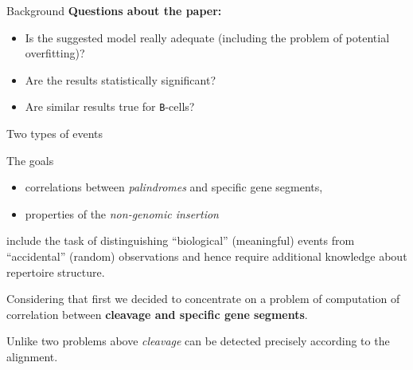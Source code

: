 \documentclass{beamer}\usepackage[]{graphicx}\usepackage[]{color}
\begin{document}
\begin{frame}{Background}
  \textbf{Questions about the paper:}
  \begin{itemize}
    \item Is the suggested model really adequate (including the problem of potential overfitting)?
    \item Are the results statistically significant?
    \item Are similar results true for \texttt{B}-cells?
  \end{itemize}
% 
\end{frame}

\begin{frame}{Two types of events}
  

  The goals 
  \begin{itemize}
    \item correlations between \textit{palindromes} and specific gene segments,
    \item properties of the \textit{non-genomic insertion}
  \end{itemize}
  include the task of distinguishing {\color{blue} ``biological''} (meaningful) events from {\color{blue} ``accidental''} (random) observations and hence require additional knowledge about repertoire structure.
  
  \bigskip
  Considering that first we decided to concentrate on a problem of computation of correlation between \textbf{cleavage and specific gene segments}.
 
  \pause
  \bigskip
  {\color{blue} Unlike two problems above \textit{cleavage} can be detected precisely according to the alignment.}
\end{frame}
\end{document}

